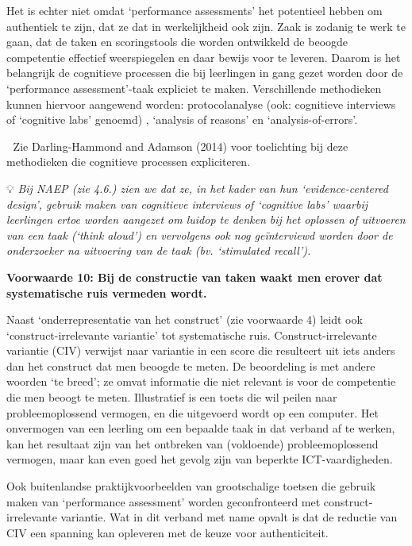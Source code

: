 \documentclass[
  letterpaper,
]{report}
\begin{document}
Het is echter niet omdat `performance assessments' het potentieel hebben
om authentiek te zijn, dat ze dat in werkelijkheid ook zijn. Zaak is
zodanig te werk te gaan, dat de taken en scoringstools die worden
ontwikkeld de beoogde competentie effectief weerspiegelen en daar bewijs
voor te leveren. Daarom is het belangrijk de cognitieve processen die
bij leerlingen in gang gezet worden door de `performance
assessment'-taak expliciet te maken. Verschillende methodieken kunnen
hiervoor aangewend worden: protocolanalyse (ook: cognitieve interviews
of `cognitive labs' genoemd) , `analysis of reasons' en
`analysis-of-errors'.

📖 Zie Darling-Hammond and Adamson (2014) voor toelichting bij deze
methodieken die cognitieve processen expliciteren.

💡 \emph{Bij NAEP (zie 4.6.) zien we dat ze, in het kader van hun
`evidence-centered design', gebruik maken van cognitieve interviews of
`cognitive labs' waarbij leerlingen ertoe worden aangezet om luidop te
denken bij het oplossen of uitvoeren van een taak (`think aloud') en
vervolgens ook nog geïnterviewd worden door de onderzoeker na uitvoering
van de taak (bv. `stimulated recall').}

\textbf{Voorwaarde 10: Bij de constructie van taken waakt men erover dat
systematische ruis vermeden wordt.}

Naast `onderrepresentatie van het construct' (zie voorwaarde 4) leidt
ook `construct-irrelevante variantie' tot systematische ruis.
Construct-irrelevante variantie (CIV) verwijst naar variantie in een
score die resulteert uit iets anders dan het construct dat men beoogde
te meten. De beoordeling is met andere woorden `te breed'; ze omvat
informatie die niet relevant is voor de competentie die men beoogt te
meten. Illustratief is een toets die wil peilen naar probleemoplossend
vermogen, en die uitgevoerd wordt op een computer. Het onvermogen van
een leerling om een bepaalde taak in dat verband af te werken, kan het
resultaat zijn van het ontbreken van (voldoende) probleemoplossend
vermogen, maar kan even goed het gevolg zijn van beperkte
ICT-vaardigheden.

Ook buitenlandse praktijkvoorbeelden van grootschalige toetsen die
gebruik maken van `performance assessment' worden geconfronteerd met
construct-irrelevante variantie. Wat in dit verband met name opvalt is
dat de reductie van CIV een spanning kan opleveren met de keuze voor
authenticiteit.
\end{document}
